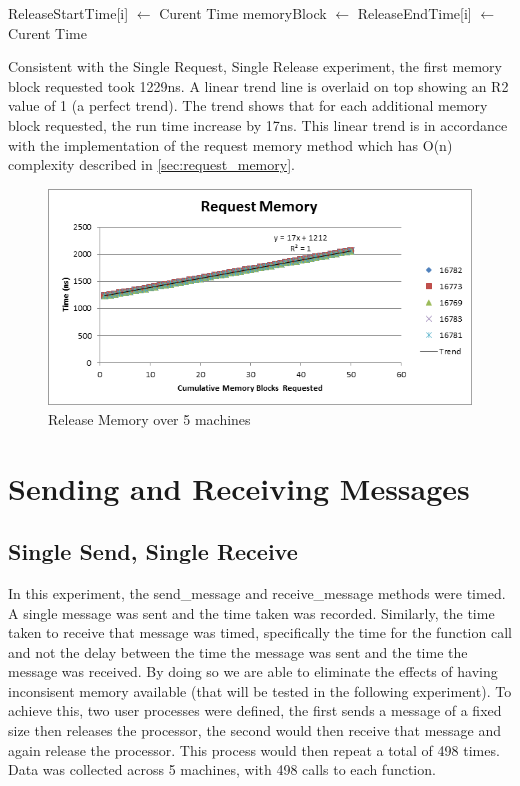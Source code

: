 \documentclass[12pt]{report}
\begin{document}
\begin{algorithmic}
      \State ReleaseStartTime[i] $\gets$ Curent Time
      \State memoryBlock $\gets$  
      \State ReleaseEndTime[i] $\gets$ Curent Time
    \EndFor
  \EndFunction
\end{algorithmic}

\par Consistent with the Single Request, Single Release experiment, the first memory block requested took 1229ns. A linear trend line is overlaid on top showing an R2 value of 1 (a perfect trend). The trend shows that for each additional memory block requested, the run time increase by 17ns. This linear trend is in accordance with the implementation of the request memory method which has O(n) complexity described in \ref{sec:request_memory}.

\begin{figure}[h!]
  \centering
    \includegraphics{RequestMemory.png}
  \caption{Release Memory over 5 machines}
\end{figure}

\section{Sending and Receiving Messages}
\subsection{Single Send, Single Receive}
\label{sec:single_send_single_receive}

In this experiment, the send\_message and receive\_message methods were timed. A single message was sent and the time taken was recorded. Similarly, the time taken to receive that message was timed, specifically the time for the function call and not the delay between the time the message was sent and the time the message was received. By doing so we are able to eliminate the effects of having inconsisent memory available (that will be tested in the following experiment). To achieve this, two user processes were defined, the first sends a message of a fixed size then releases the processor, the second would then receive that message and again release the processor. This process would then repeat a total of 498 times. Data was collected across 5 machines, with 498 calls to each function.
\end{document}
